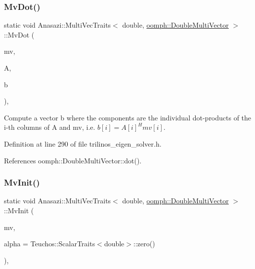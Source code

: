 \subsubsection{\texorpdfstring{Mv\+Dot()}{MvDot()}}
{\footnotesize\ttfamily static void Anasazi\+::\+Multi\+Vec\+Traits$<$ double, \hyperlink{classoomph_1_1DoubleMultiVector}{oomph\+::\+Double\+Multi\+Vector} $>$\+::Mv\+Dot (\begin{DoxyParamCaption}\item[{const \hyperlink{classoomph_1_1DoubleMultiVector}{oomph\+::\+Double\+Multi\+Vector} \&}]{mv,  }\item[{const \hyperlink{classoomph_1_1DoubleMultiVector}{oomph\+::\+Double\+Multi\+Vector} \&}]{A,  }\item[{std\+::vector$<$ double $>$ \&}]{b }\end{DoxyParamCaption})\hspace{0.3cm}{\ttfamily [inline]}, {\ttfamily [static]}}



Compute a vector {\ttfamily b} where the components are the individual dot-\/products of the {\ttfamily i-\/th} columns of {\ttfamily A} and {\ttfamily mv}, i.\+e. $b[i] = A[i]^Hmv[i]$. 



Definition at line 290 of file trilinos\+\_\+eigen\+\_\+solver.\+h.



References oomph\+::\+Double\+Multi\+Vector\+::dot().

\mbox{\label{classAnasazi_1_1MultiVecTraits_3_01double_00_01oomph_1_1DoubleMultiVector_01_4_af1301c3616281ebea692c28378dfead1}} 
\subsubsection{\texorpdfstring{Mv\+Init()}{MvInit()}}
{\footnotesize\ttfamily static void Anasazi\+::\+Multi\+Vec\+Traits$<$ double, \hyperlink{classoomph_1_1DoubleMultiVector}{oomph\+::\+Double\+Multi\+Vector} $>$\+::Mv\+Init (\begin{DoxyParamCaption}\item[{\hyperlink{classoomph_1_1DoubleMultiVector}{oomph\+::\+Double\+Multi\+Vector} \&}]{mv,  }\item[{const double}]{alpha = {\ttfamily Teuchos\+:\+:ScalarTraits$<$double$>$\+:\+:zero()} }\end{DoxyParamCaption})\hspace{0.3cm}{\ttfamily [inline]}, {\ttfamily [static]}}



